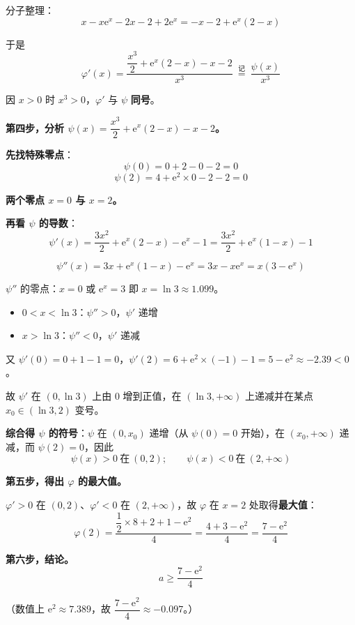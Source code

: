 分子整理：
\[x-x\mathrm e^{x}-2x-2+2\mathrm e^{x}=-x-2+\mathrm e^{x}(2-x)\]

于是
\[\varphi'(x)=\frac{\dfrac{x^{3}}2+\mathrm e^{x}(2-x)-x-2}{x^{3}}\ \overset{\text{记}}{=}\ \frac{\psi(x)}{x^{3}}\]

因 $x>0$ 时 $x^{3}>0$，$\varphi'$ 与 $\psi$ \textbf{同号}。

\textbf{第四步，分析 $\psi(x)=\dfrac{x^{3}}2+\mathrm e^{x}(2-x)-x-2$。}

\textbf{先找特殊零点}：
\[\psi(0)=0+2-0-2=0\]
\[\psi(2)=4+\mathrm e^{2}\times0-2-2=0\]

\textbf{两个零点 $x=0$ 与 $x=2$。}

\textbf{再看 $\psi$ 的导数}：
\[\psi'(x)=\frac{3x^{2}}2+\mathrm e^{x}(2-x)-\mathrm e^{x}-1=\frac{3x^{2}}2+\mathrm e^{x}(1-x)-1\]

\[\psi''(x)=3x+\mathrm e^{x}(1-x)-\mathrm e^{x}=3x-x\mathrm e^{x}=x\left(3-\mathrm e^{x}\right)\]

$\psi''$ 的零点：$x=0$ 或 $\mathrm e^{x}=3$ 即 $x=\ln3\approx1.099$。

\begin{itemize}
\item $0<x<\ln3$：$\psi''>0$，$\psi'$ 递增
\item $x>\ln3$：$\psi''<0$，$\psi'$ 递减
\end{itemize}

又 $\psi'(0)=0+1-1=0$，$\psi'(2)=6+\mathrm e^{2}\times(-1)-1=5-\mathrm e^{2}\approx-2.39<0$。

故 $\psi'$ 在 $(0,\ln3)$ 上由 $0$ 增到正值，在 $(\ln3,+\infty)$ 上递减并在某点 $x_0\in(\ln3,2)$ 变号。

\textbf{综合得 $\psi$ 的符号}：$\psi$ 在 $(0,x_0)$ 递增（从 $\psi(0)=0$ 开始），在 $(x_0,+\infty)$ 递减，而 $\psi(2)=0$，因此
\[\psi(x)>0\ \text{在}\ (0,2);\qquad \psi(x)<0\ \text{在}\ (2,+\infty)\]

\textbf{第五步，得出 $\varphi$ 的最大值。}

$\varphi'>0$ 在 $(0,2)$、$\varphi'<0$ 在 $(2,+\infty)$，故 $\varphi$ 在 $x=2$ 处取得\textbf{最大值}：
\[\varphi(2)=\frac{\dfrac12\times8+2+1-\mathrm e^{2}}{4}=\frac{4+3-\mathrm e^{2}}4=\frac{7-\mathrm e^{2}}4\]

\textbf{第六步，结论。}
\[a\ge\frac{7-\mathrm e^{2}}4\]

\gkanswer{答案：$a\in\left[\dfrac{7-\mathrm e^{2}}4,\ +\infty\right)$}

（数值上 $\mathrm e^{2}\approx7.389$，故 $\dfrac{7-\mathrm e^{2}}4\approx-0.097$。）

